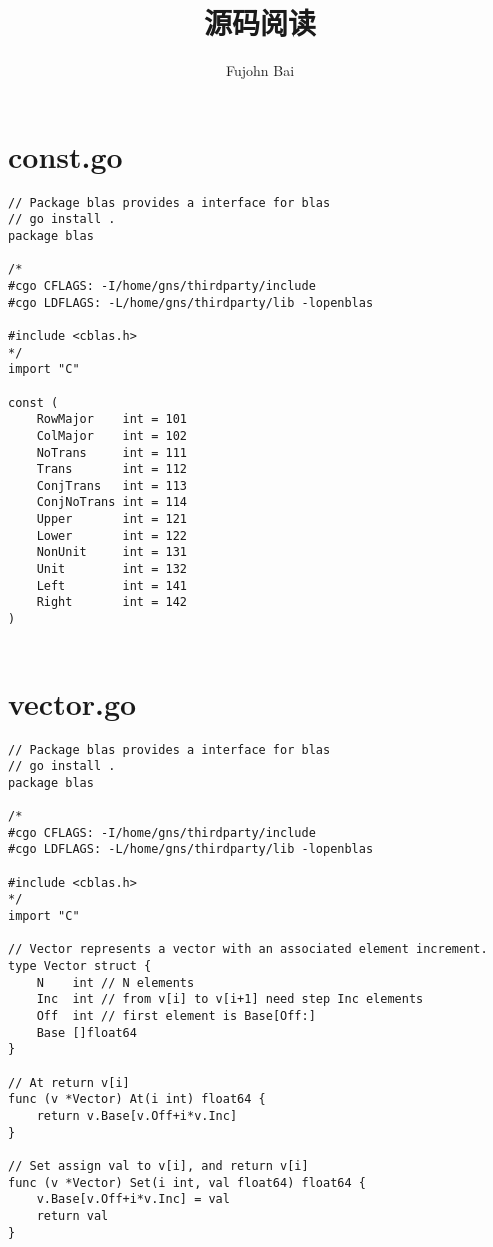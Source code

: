 \documentclass[a5paper,titlepage,landscape,oneside,12pt]{book}
\title{源码阅读}
\author{Fujohn Bai}
\begin{document}
\maketitle

\lstset{
	tabsize=2,
	breaklines=true
}

\chapter{const.go}

\begin{lstlisting}
// Package blas provides a interface for blas
// go install .
package blas

/*
#cgo CFLAGS: -I/home/gns/thirdparty/include
#cgo LDFLAGS: -L/home/gns/thirdparty/lib -lopenblas

#include <cblas.h>
*/
import "C"

const (
	RowMajor    int = 101
	ColMajor    int = 102
	NoTrans     int = 111
	Trans       int = 112
	ConjTrans   int = 113
	ConjNoTrans int = 114
	Upper       int = 121
	Lower       int = 122
	NonUnit     int = 131
	Unit        int = 132
	Left        int = 141
	Right       int = 142
)


\end{lstlisting}

\chapter{vector.go}

\begin{lstlisting}
// Package blas provides a interface for blas
// go install .
package blas

/*
#cgo CFLAGS: -I/home/gns/thirdparty/include
#cgo LDFLAGS: -L/home/gns/thirdparty/lib -lopenblas

#include <cblas.h>
*/
import "C"

// Vector represents a vector with an associated element increment.
type Vector struct {
	N    int // N elements
	Inc  int // from v[i] to v[i+1] need step Inc elements
	Off  int // first element is Base[Off:]
	Base []float64
}

// At return v[i]
func (v *Vector) At(i int) float64 {
	return v.Base[v.Off+i*v.Inc]
}

// Set assign val to v[i], and return v[i]
func (v *Vector) Set(i int, val float64) float64 {
	v.Base[v.Off+i*v.Inc] = val
	return val
}


\end{lstlisting}
\end{document}
